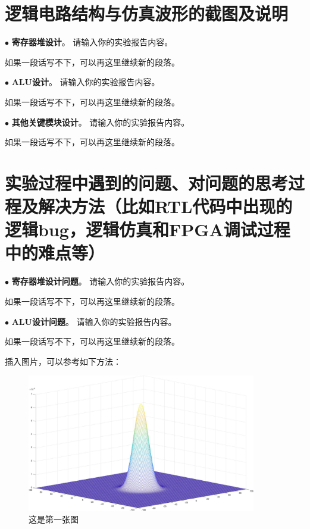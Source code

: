 \documentclass[11pt]{article}
\begin{document}


\section{逻辑电路结构与仿真波形的截图及说明}

\noindent
$\bullet$
\textbf{寄存器堆设计}。
请输入你的实验报告内容。

如果一段话写不下，可以再这里继续新的段落。

\vspace{1ex}

\noindent
$\bullet$
\textbf{ALU设计}。
请输入你的实验报告内容。

如果一段话写不下，可以再这里继续新的段落。

\vspace{1ex}

\noindent
$\bullet$
\textbf{其他关键模块设计}。
请输入你的实验报告内容。

如果一段话写不下，可以再这里继续新的段落。

\section{实验过程中遇到的问题、对问题的思考过程及解决方法（比如RTL代码中出现的逻辑bug，逻辑仿真和FPGA调试过程中的难点等）}

\noindent
$\bullet$
\textbf{寄存器堆设计问题}。
请输入你的实验报告内容。

如果一段话写不下，可以再这里继续新的段落。

\vspace{1ex}

\noindent
$\bullet$
\textbf{ALU设计问题}。
请输入你的实验报告内容。

如果一段话写不下，可以再这里继续新的段落。

插入图片，可以参考如下方法：
\begin{figure}[h]
  \centering
  \includegraphics[width=10cm]{fig/Gaussian.pdf}
  \caption{这是第一张图}
\end{figure}
\end{document}
